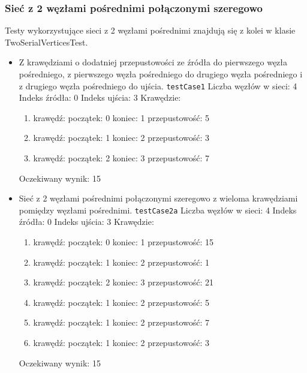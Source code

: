 \subsubsection{Sieć z 2 węzłami pośrednimi połączonymi szeregowo}
Testy wykorzystujące sieci z 2 węzłami pośrednimi znajdują się z kolei w klasie
TwoSerialVerticesTest.
\begin{itemize}[nosep]
    \item Z krawędziami o dodatniej przepustowości ze źródła do pierwszego węzła
    pośredniego, z pierwszego węzła pośredniego do drugiego węzła pośredniego i z
    drugiego węzła pośredniego do ujścia.
    \texttt{testCase1}
    Liczba węzłów w sieci: 4
    Indeks źródła: 0
    Indeks ujścia: 3
    Krawędzie:
    \begin{enumerate}[nosep]
        \item krawędź:
        początek: 0
        koniec: 1
        przepustowość: 5
        \item krawędź:
        początek: 1
        koniec: 2
        przepustowość: 3
        \item krawędź:
        początek: 2
        koniec: 3
        przepustowość: 7
    \end{enumerate}
    Oczekiwany wynik: 15

    \item Sieć z 2 węzłami pośrednimi połączonymi szeregowo z wieloma
    krawędziami pomiędzy węzłami pośrednimi.
    \texttt{testCase2a}
    Liczba węzłów w sieci: 4
    Indeks źródła: 0
    Indeks ujścia: 3
    Krawędzie:
    \begin{enumerate}[nosep]
        \item krawędź:
        początek: 0
        koniec: 1
        przepustowość: 15
        \item krawędź:
        początek: 1
        koniec: 2
        przepustowość: 1
        \item krawędź:
        początek: 2
        koniec: 3
        przepustowość: 21
        \item krawędź:
        początek: 1
        koniec: 2
        przepustowość: 5
        \item krawędź:
        początek: 1
        koniec: 2
        przepustowość: 7
        \item krawędź:
        początek: 1
        koniec: 2
        przepustowość: 3
    \end{enumerate}
    Oczekiwany wynik: 15


\end{itemize}

